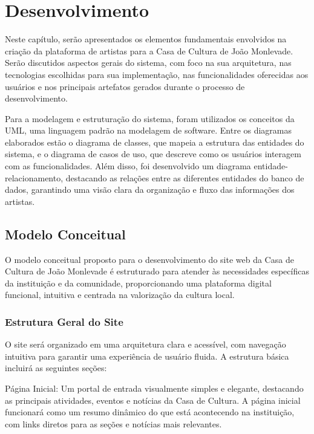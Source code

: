 \chapter{Desenvolvimento}
\label{cap:desenvolvimento}
Neste capítulo, serão apresentados os elementos fundamentais envolvidos na criação da plataforma de artistas para a Casa de Cultura de João Monlevade. Serão discutidos aspectos gerais do sistema, com foco na sua arquitetura, nas tecnologias escolhidas para sua implementação, nas funcionalidades oferecidas aos usuários e nos principais artefatos gerados durante o processo de desenvolvimento.

Para a modelagem e estruturação do sistema, foram utilizados os conceitos da UML, uma linguagem padrão na modelagem de software. Entre os diagramas elaborados estão o diagrama de classes, que mapeia a estrutura das entidades do sistema, e o diagrama de casos de uso, que descreve como os usuários interagem com as funcionalidades. Além disso, foi desenvolvido um diagrama entidade-relacionamento, destacando as relações entre as diferentes entidades do banco de dados, garantindo uma visão clara da organização e fluxo das informações dos artistas.

\section{Modelo Conceitual}

O modelo conceitual proposto para o desenvolvimento do site web da Casa de Cultura de João Monlevade é estruturado para atender às necessidades específicas da instituição e da comunidade, proporcionando uma plataforma digital funcional, intuitiva e centrada na valorização da cultura local.

\subsection{Estrutura Geral do Site}

O site será organizado em uma arquitetura clara e acessível, com navegação intuitiva para garantir uma experiência de usuário fluida. A estrutura básica incluirá as seguintes seções:

Página Inicial: Um portal de entrada visualmente simples e elegante, destacando as principais atividades, eventos e notícias da Casa de Cultura. A página inicial funcionará como um resumo dinâmico do que está acontecendo na instituição, com links diretos para as seções e notícias mais relevantes.


